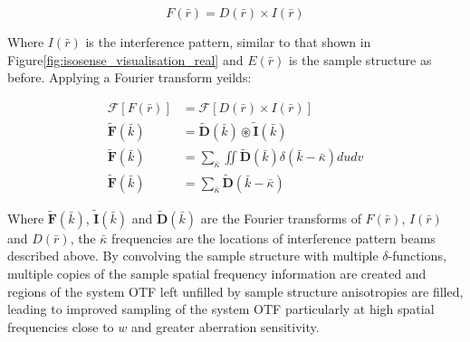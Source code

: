 	\begin{equation}\label{eq:isosense_real}
		F(\bar{r}) = D(\bar{r}) \times I(\bar{r})
	\end{equation}	
	
	Where $I(\bar{r})$ is the interference pattern, similar to that shown in 
	Figure\ref{fig:isosense_visualisation_real} and $E(\bar{r})$ is the sample
	structure as before. Applying a Fourier transform yeilds:
	
	\begin{equation}\label{eq:isosense_ft}
		\begin{split}
			\mathcal{F}[F(\bar{r})] &= \mathcal{F}[D(\bar{r})\times I(\bar{r})] \\
			\tilde{\textbf{F}}(\bar{k}) &= \tilde{\textbf{D}}(\bar{k}) \circledast \tilde{\textbf{I}}(\bar{k}) \\
			\tilde{\textbf{F}}(\bar{k}) &= \sum_{\bar{\kappa}}\iint\tilde{\textbf{D}}(\bar{k})\delta(\bar{k} - \bar{\kappa})dudv \\
			\tilde{\textbf{F}}(\bar{k}) &= \sum_{\bar{\kappa}}\tilde{\textbf{D}}(\bar{k} - \bar{\kappa})
		\end{split}
	\end{equation}
	
	Where $\tilde{\textbf{F}}(\bar{k})$, $\tilde{\textbf{I}}(\bar{k})$ and 
	$\tilde{\textbf{D}}(\bar{k})$ are the Fourier transforms of $F(\bar{r})$, 
	$I(\bar{r})$ and $D(\bar{r})$, the $\bar{\kappa}$ frequencies are the 
	locations of interference pattern beams described above. By convolving 
	the sample structure with multiple $\delta$-functions, multiple copies 
	of the sample spatial frequency information are created and regions of 
	the system OTF left unfilled by sample structure anisotropies are 
	filled, leading to improved sampling of the system OTF particularly
	at high spatial frequencies close to $w$ and greater aberration
	sensitivity.\cite{vzurauskas2019isosense}
	
